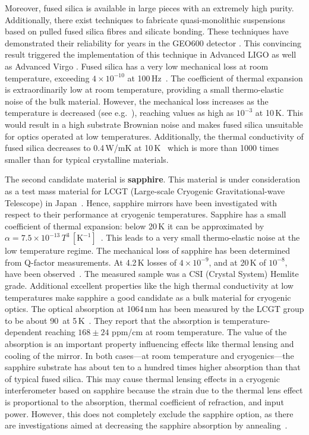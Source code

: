 Moreover, fused silica is available in large pieces with an extremely high purity. Additionally, there exist techniques to fabricate quasi-monolithic suspensions based on pulled fused silica fibres and silicate bonding. These techniques have demonstrated their reliability for years in the GEO600 detector \cite{Plissi1998,Willke2002}. This convincing result triggered the implementation of this technique in Advanced LIGO \cite{aLIGO,Robertson2002,Cumming2009} as well as Advanced Virgo \cite{Tournefier2009,Lorenzini2010}. Fused silica has a very low mechanical loss at room temperature, exceeding $4\times10^{-10}$ at 100\,Hz~\cite{Penn2006}. The coefficient of thermal expansion is extraordinarily low at room temperature, providing a small thermo-elastic noise of the bulk material. However, the mechanical loss increases as the temperature is decreased (see e.g.~\cite{Anderson1955, Schwarz2009}), reaching values as high as $10^{-3}$ at 10\,K. This would result in a high substrate Brownian noise and makes fused silica unsuitable for optics operated at low temperatures. Additionally, the thermal conductivity of fused silica decreases to 0.4\,W/mK at 10\,K~\cite{Franc2009} which is more than 1000 times smaller than for typical crystalline materials.

The second candidate material is {\bf sapphire}. This material is under consideration as a test mass material for LCGT (Large-scale Cryogenic Gravitational-wave Telescope) in Japan~\cite{Tomaru2001}. Hence, sapphire mirrors have been investigated with respect to their performance at cryogenic temperatures. Sapphire has a small coefficient of thermal expansion: below 20\,K it can be approximated by $\alpha=7.5 \times 10^{-13}\,T^3\,\mathrm{[K^{-1}]}$~\cite{Taylor1996}. This leads to a very small thermo-elastic noise at the low temperature regime. The mechanical loss of sapphire has been determined from Q-factor measurements. At 4.2\,K losses of $4\times 10^{-9}$, and at 20\,K of $10^{-8}$, have been observed~\cite{Uchiyama1999}. The measured sample was a CSI (Crystal System) Hemlite grade. Additional excellent properties like the high thermal conductivity at low temperatures make sapphire a good candidate as a bulk material for cryogenic optics. The optical absorption at 1064\,nm has been measured by the LCGT group to be about 90\ at 5\,K~\cite{Tomaru2001}. They report that the absorption is temperature-dependent reaching $168 \pm 24$ ppm/cm at room temperature. The value of the absorption is an important property influencing effects like thermal lensing and cooling of the mirror. In both cases---at room temperature and cryogenics---the sapphire substrate has about ten to a hundred times higher absorption than that of typical fused silica. This may cause thermal lensing effects in a cryogenic interferometer based on sapphire because the strain due to the thermal lens effect is proportional to the absorption, thermal coefficient of refraction, and input power. However, this does not completely exclude the sapphire option, as there are investigations aimed at decreasing the sapphire absorption by annealing~\cite{Alexandrovski2000}.

